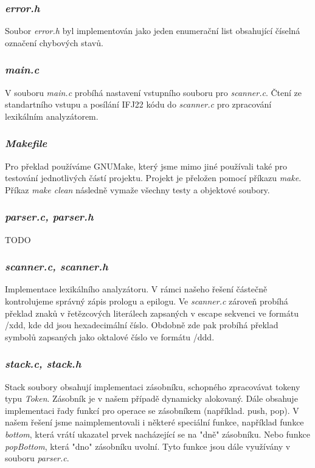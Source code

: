 \documentclass{article}
\begin{document}
\subsubsection{\emph{error.h}}
Soubor \emph{error.h} byl implementován jako jeden enumerační list obsahující číselná označení chybových stavů.

\subsubsection{\emph{main.c}}
V souboru \emph{main.c} probíhá nastavení vstupního souboru pro \emph{scanner.c}. Čtení ze standartního vstupu a posílání IFJ22 kódu do \emph{scanner.c} pro zpracování lexikálním analyzátorem.

\subsubsection{\emph{Makefile}}
Pro překlad používáme GNUMake, který jsme mimo jiné používali také pro testování jednotlivých částí projektu. Projekt je přeložen pomocí příkazu \emph{make}. Příkaz \emph{make clean} následně vymaže všechny testy a objektové soubory.

\subsubsection{\emph{parser.c, parser.h}}
TODO\\

\subsubsection{\emph{scanner.c, scanner.h}}
Implementace lexikálního analyzátoru. V rámci našeho řešení částečně kontrolujeme správný zápis prologu a epilogu. Ve \emph{scanner.c} zároveň probíhá překlad znaků v řetězcových literálech zapsaných v escape sekvenci ve formátu /xdd, kde dd jsou hexadecimální číslo. Obdobně zde pak probíhá překlad symbolů zapsaných jako oktalové číslo ve formátu /ddd.

\subsubsection{\emph{stack.c, stack.h}}
Stack soubory obsahují implementaci zásobníku, schopného zpracovávat tokeny typu \emph{Token}. Zásobník je v našem případě dynamicky alokovaný. Dále obsahuje implementaci řady funkcí pro operace se zásobníkem (například. push, pop). V našem řešení jsme naimplementovali i některé speciální funkce, například funkce \emph{bottom}, která vrátí ukazatel prvek nacházející se na "dně" zásobníku. Nebo funkce \emph{popBottom}, která "dno" zásobníku uvolní. Tyto funkce jsou dále využívány v souboru \emph{parser.c}.
\end{document}
